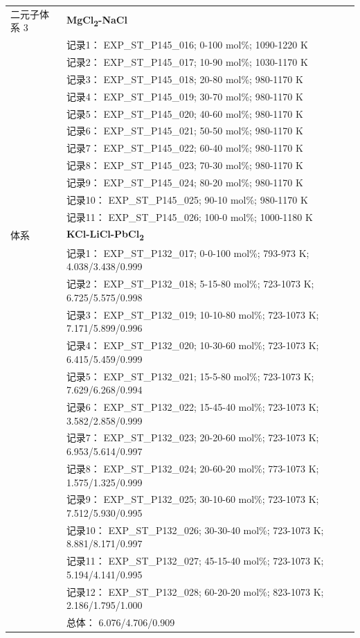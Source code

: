 \documentclass[12pt]{article}
\begin{document}
{\begin{longtable}[]{@{}
  >{\raggedright\arraybackslash}p{}
  >{\raggedright\arraybackslash}p{}@{}}
二元子体系 3  & \textbf{MgCl\textsubscript{2}-NaCl} \\
 & 记录1： EXP\_ST\_P145\_016; 0-100 mol\%; 1090-1220 K \\
 & 记录2： EXP\_ST\_P145\_017; 10-90 mol\%; 1030-1170 K \\
 & 记录3： EXP\_ST\_P145\_018; 20-80 mol\%; 980-1170 K \\
 & 记录4： EXP\_ST\_P145\_019; 30-70 mol\%; 980-1170 K \\
 & 记录5： EXP\_ST\_P145\_020; 40-60 mol\%; 980-1170 K \\
 & 记录6： EXP\_ST\_P145\_021; 50-50 mol\%; 980-1170 K \\
 & 记录7： EXP\_ST\_P145\_022; 60-40 mol\%; 980-1170 K \\
 & 记录8： EXP\_ST\_P145\_023; 70-30 mol\%; 980-1170 K \\
 & 记录9： EXP\_ST\_P145\_024; 80-20 mol\%; 980-1170 K \\
 & 记录10： EXP\_ST\_P145\_025; 90-10 mol\%; 980-1170 K \\
 & 记录11： EXP\_ST\_P145\_026; 100-0 mol\%; 1000-1180 K  \\

\midrule
体系 & \textbf{KCl-LiCl-PbCl\textsubscript{2}} \\
 & 记录1： EXP\_ST\_P132\_017; 0-0-100 mol\%; 793-973 K; 4.038/3.438/0.999 \\
 & 记录2： EXP\_ST\_P132\_018; 5-15-80 mol\%; 723-1073 K; 6.725/5.575/0.998 \\
 & 记录3： EXP\_ST\_P132\_019; 10-10-80 mol\%; 723-1073 K; 7.171/5.899/0.996 \\
 & 记录4： EXP\_ST\_P132\_020; 10-30-60 mol\%; 723-1073 K; 6.415/5.459/0.999 \\
 & 记录5： EXP\_ST\_P132\_021; 15-5-80 mol\%; 723-1073 K; 7.629/6.268/0.994 \\
 & 记录6： EXP\_ST\_P132\_022; 15-45-40 mol\%; 723-1073 K; 3.582/2.858/0.999 \\
 & 记录7： EXP\_ST\_P132\_023; 20-20-60 mol\%; 723-1073 K; 6.953/5.614/0.997 \\
 & 记录8： EXP\_ST\_P132\_024; 20-60-20 mol\%; 773-1073 K; 1.575/1.325/0.999 \\
 & 记录9： EXP\_ST\_P132\_025; 30-10-60 mol\%; 723-1073 K; 7.512/5.930/0.995 \\
 & 记录10： EXP\_ST\_P132\_026; 30-30-40 mol\%; 723-1073 K; 8.881/8.171/0.997 \\
 & 记录11： EXP\_ST\_P132\_027; 45-15-40 mol\%; 723-1073 K; 5.194/4.141/0.995 \\
 & 记录12： EXP\_ST\_P132\_028; 60-20-20 mol\%; 823-1073 K; 2.186/1.795/1.000 \\
 & 总体： 6.076/4.706/0.909  \\


\end{longtable}}
\end{document}
